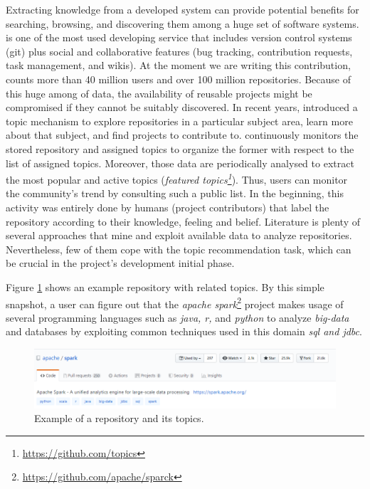Extracting knowledge from a developed system can provide potential benefits for searching, browsing, and discovering them among a huge set of software systems.
\GH is one of the most used developing service that includes version control systems (\ie git) plus social and collaborative features (\eg bug tracking, contribution requests, task management, and wikis).
At the moment we are writing this contribution, \GH counts more than 40 million users and over 100 million repositories. Because of this huge among of data, the availability of reusable projects might be compromised if they cannot be suitably discovered. In recent years, \GH introduced a topic mechanism to explore repositories in a particular subject area, learn more about that subject, and find projects to contribute to.
\GH continuously monitors the stored repository and assigned topics to organize the former with respect to the list of assigned topics. Moreover, those data are periodically analysed to extract the most popular and active topics (\ie \emph{featured topics\footnote{\url{https://github.com/topics}}}). Thus, users can monitor the community’s trend by consulting such a public list. In the beginning, this activity was entirely done by humans (\ie project contributors) that label the repository according to their knowledge, feeling and belief. Literature is plenty of several approaches that mine and exploit available data to analyze repositories. Nevertheless, few of them cope with the topic recommendation task, which can be crucial in the project's development initial phase.

Figure \ref{fig:spark} shows an example repository with related topics. By this simple snapshot, a \GH user can figure out that the \emph{apache spark}\footnote{\url{https://github.com/apache/sparck}} project makes usage of several programming languages such as \emph{java, r,} and \emph{python} to analyze \emph{big-data} and databases by exploiting common techniques used in this domain \ie \emph{sql and jdbc}. 

\begin{figure}[h!]
	\centering
	\includegraphics[width=0.8\linewidth]{figs/spark_topics.png}
	\caption{Example of a \GH repository and its topics.}
	\label{fig:spark}
\end{figure}

